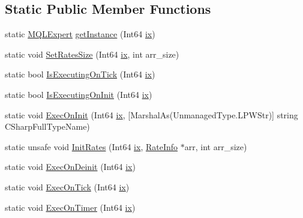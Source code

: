 \subsection*{Static Public Member Functions}
\begin{DoxyCompactItemize}
\item 
static \hyperlink{class_m_q_l4_c_sharp_1_1_base_1_1_m_q_l_1_1_m_q_l_expert}{M\+Q\+L\+Expert} \hyperlink{class_m_q_l4_c_sharp_1_1_base_1_1_m_q_l_1_1_m_q_l_expert_a7cb67cddcef50cc5e2fbf023daeff7f2}{get\+Instance} (Int64 \hyperlink{class_m_q_l4_c_sharp_1_1_base_1_1_m_q_l_1_1_m_q_l_expert_a98b5a835bb18c023f5160275efa74619}{ix})
\item 
static void \hyperlink{class_m_q_l4_c_sharp_1_1_base_1_1_m_q_l_1_1_m_q_l_expert_a8086f1671708aa1d018bc0338d6c52fd}{Set\+Rates\+Size} (Int64 \hyperlink{class_m_q_l4_c_sharp_1_1_base_1_1_m_q_l_1_1_m_q_l_expert_a98b5a835bb18c023f5160275efa74619}{ix}, int arr\+\_\+size)
\item 
static bool \hyperlink{class_m_q_l4_c_sharp_1_1_base_1_1_m_q_l_1_1_m_q_l_expert_a54b6e31dcf7e1af00d80b0a34a6cd4c9}{Is\+Executing\+On\+Tick} (Int64 \hyperlink{class_m_q_l4_c_sharp_1_1_base_1_1_m_q_l_1_1_m_q_l_expert_a98b5a835bb18c023f5160275efa74619}{ix})
\item 
static bool \hyperlink{class_m_q_l4_c_sharp_1_1_base_1_1_m_q_l_1_1_m_q_l_expert_a45b4e503c3f80fee548ce0864acd10f7}{Is\+Executing\+On\+Init} (Int64 \hyperlink{class_m_q_l4_c_sharp_1_1_base_1_1_m_q_l_1_1_m_q_l_expert_a98b5a835bb18c023f5160275efa74619}{ix})
\item 
static void \hyperlink{class_m_q_l4_c_sharp_1_1_base_1_1_m_q_l_1_1_m_q_l_expert_a000170fc70b78b66a95cc89d14c24835}{Exec\+On\+Init} (Int64 \hyperlink{class_m_q_l4_c_sharp_1_1_base_1_1_m_q_l_1_1_m_q_l_expert_a98b5a835bb18c023f5160275efa74619}{ix}, \mbox{[}Marshal\+As(Unmanaged\+Type.\+L\+P\+W\+Str)\mbox{]} string C\+Sharp\+Full\+Type\+Name)
\item 
static unsafe void \hyperlink{class_m_q_l4_c_sharp_1_1_base_1_1_m_q_l_1_1_m_q_l_expert_a5338530f48ef189b90acbf17e71bfd9a}{Init\+Rates} (Int64 \hyperlink{class_m_q_l4_c_sharp_1_1_base_1_1_m_q_l_1_1_m_q_l_expert_a98b5a835bb18c023f5160275efa74619}{ix}, \hyperlink{struct_m_q_l4_c_sharp_1_1_base_1_1_m_q_l_1_1_m_q_l_expert_1_1_rate_info}{Rate\+Info} $\ast$arr, int arr\+\_\+size)
\item 
static void \hyperlink{class_m_q_l4_c_sharp_1_1_base_1_1_m_q_l_1_1_m_q_l_expert_a5aef44892464c8b0264b6ba10b15db5f}{Exec\+On\+Deinit} (Int64 \hyperlink{class_m_q_l4_c_sharp_1_1_base_1_1_m_q_l_1_1_m_q_l_expert_a98b5a835bb18c023f5160275efa74619}{ix})
\item 
static void \hyperlink{class_m_q_l4_c_sharp_1_1_base_1_1_m_q_l_1_1_m_q_l_expert_af86b2fcbe0c754c55c001ae697a1d513}{Exec\+On\+Tick} (Int64 \hyperlink{class_m_q_l4_c_sharp_1_1_base_1_1_m_q_l_1_1_m_q_l_expert_a98b5a835bb18c023f5160275efa74619}{ix})
\item 
static void \hyperlink{class_m_q_l4_c_sharp_1_1_base_1_1_m_q_l_1_1_m_q_l_expert_a44dce72d0e0184aa5727a0dcb9e977ae}{Exec\+On\+Timer} (Int64 \hyperlink{class_m_q_l4_c_sharp_1_1_base_1_1_m_q_l_1_1_m_q_l_expert_a98b5a835bb18c023f5160275efa74619}{ix})
\end{DoxyCompactItemize}
